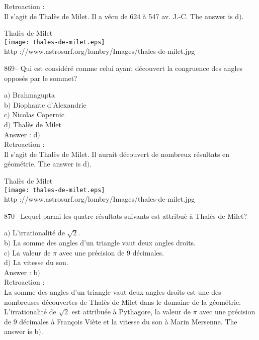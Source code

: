 ﻿\documentclass[letterpaper, 12pt]{article}
\begin{document}
Retroaction :\\
Il s'agit de Thal\`es de Milet. Il a v\'ecu de 624 \`a 547 av. J.-C.
The answer is d$)$.

        \begin{center}
        Thal\`es de Milet\\
    \texttt{[image: thales-de-milet.eps]}\\
        {\footnotesize http
://www.astrosurf.org/lombry/Images/thales-de-milet.jpg}
    \end{center}

869-- Qui est consid\'er\'e comme celui ayant d\'ecouvert la
congruence des angles oppos\'es par le sommet?

a$)$ Brahmagupta \\
b$)$ Diophante d'Alexandrie \\
c$)$ Nicolas Copernic \\
d$)$ Thal\`es de Milet \\

Answer : d$)$\\

Retroaction :\\
Il s'agit de Thal\`es de Milet. Il aurait d\'ecouvert de nombreux
r\'esultats en g\'eom\'etrie. The answer is d$)$.

        \begin{center}
        Thal\`es de Milet\\
    \texttt{[image: thales-de-milet.eps]}\\
        {\footnotesize http
://www.astrosurf.org/lombry/Images/thales-de-milet.jpg}
    \end{center}

870-- Lequel parmi les quatre r\'esultats suivants est attribu\'e
\`a Thal\`es de Milet?

a$)$ L'irrationalit\'e de $\sqrt2$. \\
b$)$ La somme des angles d'un triangle vaut deux angles droits. \\
c$)$ La valeur de $\pi$ avec une pr\'ecision de $9$ d\'ecimales. \\
d$)$ La vitesse du son. \\

Answer : b$)$\\

Retroaction : \\
La somme des angles d'un triangle vaut deux angles droits est une
des nombreuses d\'ecouvertes de Thal\`es de Milet dans le domaine de
la g\'eom\'etrie. L'irrationalit\'e de $\sqrt2$ est attribu\'ee \`a
Pythagore, la valeur de $\pi$ avec une pr\'ecision de $9$
d\'ecimales \`a Fran\c cois Vi\`ete
et la vitesse du son \`a Marin Mersenne. The answer is b$)$.\\
\end{document}
